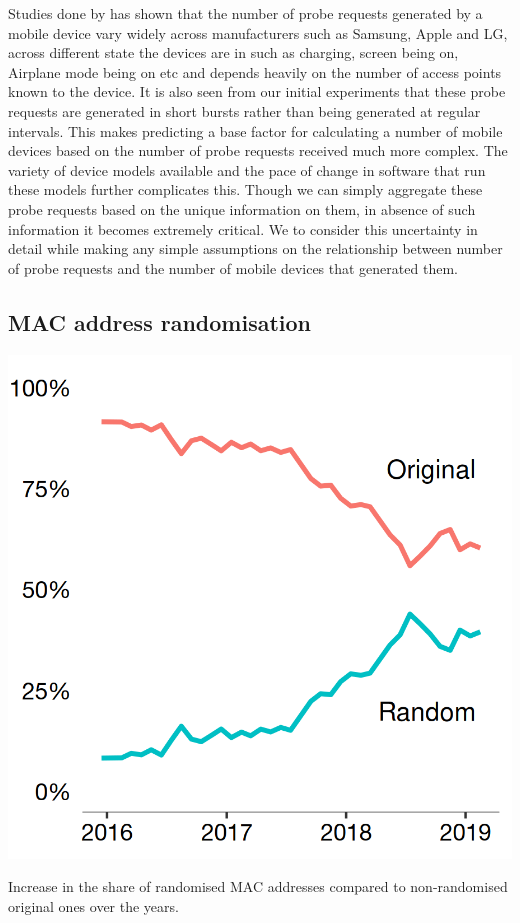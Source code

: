 Studies done by \citet{freud2015}\cite{freud2015} has shown that the number of probe requests generated by a mobile device vary widely across manufacturers such as Samsung, Apple and LG, across different state the devices are in such as charging, screen being on, Airplane mode being on etc and depends heavily on the number of access points known to the device.
It is also seen from our initial experiments that these probe requests are generated in short bursts rather than being generated at regular intervals.
This makes predicting a base factor for calculating a number of mobile devices based on the number of probe requests received much more complex.
The variety of device models available and the pace of change in software that run these models further complicates this.
Though we can simply aggregate these probe requests based on the unique information on them, in absence of such information it becomes extremely critical.
We to consider this uncertainty in detail while making any simple assumptions on the relationship between number of probe requests and the number of mobile devices that generated them.

\subsection{MAC address randomisation}

\begin{marginfigure}[4cm]
  \includegraphics{images/mac-randomisation.png}
  \caption{Increase in the share of randomised MAC addresses compared to non-randomised original ones over the years.}
  \label{figure:collection:macrandom}
\end{marginfigure}

